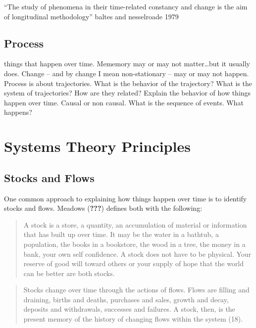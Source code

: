 \documentclass[english,,man]{apa6}
\theoremstyle{definition}
\theoremstyle{definition}
\theoremstyle{definition}
\theoremstyle{remark}
\begin{document}
\enquote{The study of phenomena in their time-related constancy and
change is the aim of longitudinal methodology} baltes and nesselroade
1979

\hypertarget{process}{%
\subsection{Process}\label{process}}

things that happen over time. Mememory may or may not matter\ldots{}but
it usually does. Change -- and by change I mean non-stationary -- may or
may not happen. Process is about trajectories. What is the behavior of
the trajectory? What is the system of trajectories? How are they
related? Explain the behavior of how things happen over time. Causal or
non causal. What is the sequence of events. What happens?

\hypertarget{systems-theory-principles}{%
\section{Systems Theory Principles}\label{systems-theory-principles}}

\hypertarget{stocks-and-flows}{%
\subsection{Stocks and Flows}\label{stocks-and-flows}}

One common approach to explaining how things happen over time is to
identify stocks and flows. Meadows ({\textbf{???}}) defines both with
the following:

\begin{quote}
A stock is a store, a quantity, an accumulation of material or
information that has built up over time. It may be the water in a
bathtub, a population, the books in a bookstore, the wood in a tree, the
money in a bank, your own self confidence. A stock does not have to be
physical. Your reserve of good will toward others or your supply of hope
that the world can be better are both stocks.
\end{quote}

\begin{quote}
Stocks change over time through the actions of flows. Flows are filling
and draining, births and deaths, purchases and sales, growth and decay,
deposits and withdrawals, successes and failures. A stock, then, is the
present memory of the history of changing flows within the system (18).
\end{quote}
\end{document}
